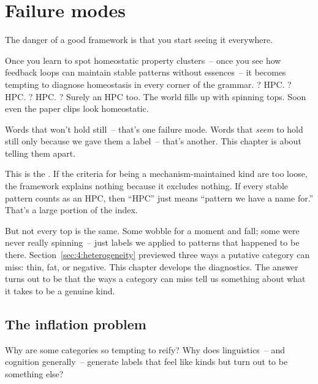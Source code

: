 
\chapter{Failure modes}
\label{ch:failure-modes}


The danger of a good framework is that you start seeing it everywhere.

Once you learn to spot homeostatic property clusters~-- once you see how feedback loops can maintain stable patterns without essences~-- it becomes tempting to diagnose homeostasis in every corner of the grammar. ? HPC. ? HPC. ? HPC. ? Surely an HPC too. The world fills up with spinning tops. Soon even the paper clips look homeostatic.

Words that won't hold still~-- that's one failure mode. Words that \emph{seem} to hold still only because we gave them a label~-- that's another. This chapter is about telling them apart.

This is the . If the criteria for being a mechanism-maintained kind are too loose, the framework explains nothing because it excludes nothing. If every stable pattern counts as an HPC, then \enquote{HPC} just means \enquote{pattern we have a name for.} That's a large portion of the index.

But not every top is the same. Some wobble for a moment and fall; some were never really spinning~-- just labels we applied to patterns that happened to be there. Section~\ref{sec:4:heterogeneity} previewed three ways a putative category can miss: thin, fat, or negative. This chapter develops the diagnostics. The answer turns out to be that the ways a category can miss tell us something about what it takes to be a genuine kind.

\section{The inflation problem}
\label{sec:8:inflation}

Why are some categories so tempting to reify? Why does linguistics~-- and cognition generally~-- generate labels that feel like kinds but turn out to be something else?

